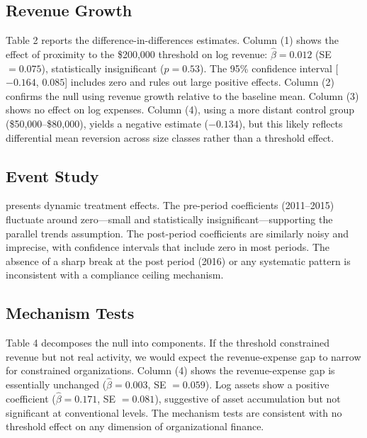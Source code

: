 \documentclass[12pt]{article}
\begin{document}


\subsection{Revenue Growth}

Table 2 reports the difference-in-differences estimates. Column (1) shows the effect of proximity to the \$200,000 threshold on log revenue: $\hat{\beta} = 0.012$ (SE $= 0.075$), statistically insignificant ($p = 0.53$). The 95\% confidence interval [$-0.164$, $0.085$] includes zero and rules out large positive effects. Column (2) confirms the null using revenue growth relative to the baseline mean. Column (3) shows no effect on log expenses. Column (4), using a more distant control group (\$50,000--\$80,000), yields a negative estimate ($-0.134$), but this likely reflects differential mean reversion across size classes rather than a threshold effect.

{\small}

\subsection{Event Study}

 presents dynamic treatment effects. The pre-period coefficients (2011--2015) fluctuate around zero---small and statistically insignificant---supporting the parallel trends assumption. The post-period coefficients are similarly noisy and imprecise, with confidence intervals that include zero in most periods. The absence of a sharp break at the post period (2016) or any systematic pattern is inconsistent with a compliance ceiling mechanism.



\subsection{Mechanism Tests}

Table 4 decomposes the null into components. If the threshold constrained revenue but not real activity, we would expect the revenue-expense gap to narrow for constrained organizations. Column (4) shows the revenue-expense gap is essentially unchanged ($\hat{\beta} = 0.003$, SE $= 0.059$). Log assets show a positive coefficient ($\hat{\beta} = 0.171$, SE $= 0.081$), suggestive of asset accumulation but not significant at conventional levels. The mechanism tests are consistent with no threshold effect on any dimension of organizational finance.
\end{document}

